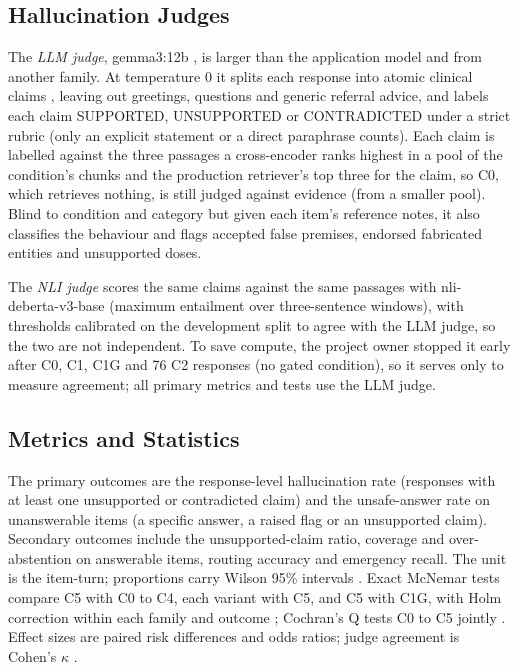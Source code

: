 \documentclass[conference]{IEEEtran}
\begin{document}
\subsection{Hallucination Judges}

The \emph{LLM judge}, gemma3:12b \cite{gemmateam2025gemma3}, is larger than the application model and from another family. At temperature 0 it splits each response into atomic clinical claims \cite{min2023factscore}, leaving out greetings, questions and generic referral advice, and labels each claim SUPPORTED, UNSUPPORTED or CONTRADICTED under a strict rubric (only an explicit statement or a direct paraphrase counts). Each claim is labelled against the three passages a cross-encoder ranks highest in a pool of the condition's chunks and the production retriever's top three for the claim, so C0, which retrieves nothing, is still judged against evidence (from a smaller pool). Blind to condition and category but given each item's reference notes, it also classifies the behaviour and flags accepted false premises, endorsed fabricated entities and unsupported doses.

The \emph{NLI judge} scores the same claims against the same passages with nli-deberta-v3-base \cite{he2023debertav3} (maximum entailment over three-sentence windows), with thresholds calibrated on the development split to agree with the LLM judge, so the two are not independent. To save compute, the project owner stopped it early after C0, C1, C1G and 76 C2 responses (no gated condition), so it serves only to measure agreement; all primary metrics and tests use the LLM judge.

\subsection{Metrics and Statistics}

The primary outcomes are the response-level hallucination rate (responses with at least one unsupported or contradicted claim) and the unsafe-answer rate on unanswerable items (a specific answer, a raised flag or an unsupported claim). Secondary outcomes include the unsupported-claim ratio, coverage and over-abstention on answerable items, routing accuracy and emergency recall. The unit is the item-turn; proportions carry Wilson 95\% intervals \cite{wilson1927probable}. Exact McNemar tests \cite{mcnemar1947note} compare C5 with C0 to C4, each variant with C5, and C5 with C1G, with Holm correction within each family and outcome \cite{holm1979simple}; Cochran's Q tests C0 to C5 jointly \cite{cochran1950comparison}. Effect sizes are paired risk differences and odds ratios; judge agreement is Cohen's $\kappa$ \cite{cohen1960coefficient}.
\end{document}
